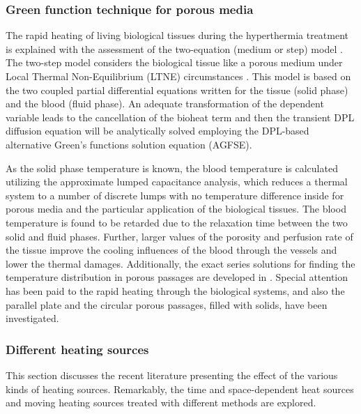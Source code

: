 \documentclass[sn-mathphys]{sn-jnl}%
\theoremstyle{thmstyleone}%
\theoremstyle{thmstyletwo}%
\theoremstyle{thmstylethree}%
\begin{document}
\subsubsection{Green function technique for porous media}
The rapid heating of living biological tissues during the hyperthermia treatment is explained with the assessment of the two-equation (medium or step) model \cite{Monte20172,Monte2017}. The two-step model considers the biological tissue like a porous medium under Local Thermal Non-Equilibrium (LTNE) circumstances \cite{Minkowycz1999}. This model is based on the two coupled partial differential equations written for the tissue (solid phase) and the blood (fluid phase). An adequate transformation of the dependent variable leads to the cancellation of the bioheat term and then the transient DPL diffusion equation will be analytically solved employing the DPL-based alternative Green’s functions solution equation (AGFSE).

As the solid phase temperature is known, the blood temperature is calculated utilizing the approximate lumped capacitance analysis, which reduces a thermal system to a number of discrete lumps with no temperature difference inside for porous media and the particular application of the biological tissues. The blood temperature is found to be retarded due to the relaxation time between the two solid and fluid phases. Further, larger values of the porosity and perfusion rate of the tissue improve the cooling influences of the blood through the vessels and lower the thermal damages. Additionally, the exact series solutions for finding the temperature distribution in porous passages are developed in \cite{AHji-Sheikh2020}. Special attention has been paid to the rapid heating through the biological systems, and also the parallel plate and the circular porous passages, filled with solids, have been investigated.

\subsubsection{Different heating sources}
This section discusses the recent literature presenting the effect of the various kinds of heating sources. Remarkably, the time and space-dependent heat sources and moving heating sources treated with different methods are explored.
\end{document}
